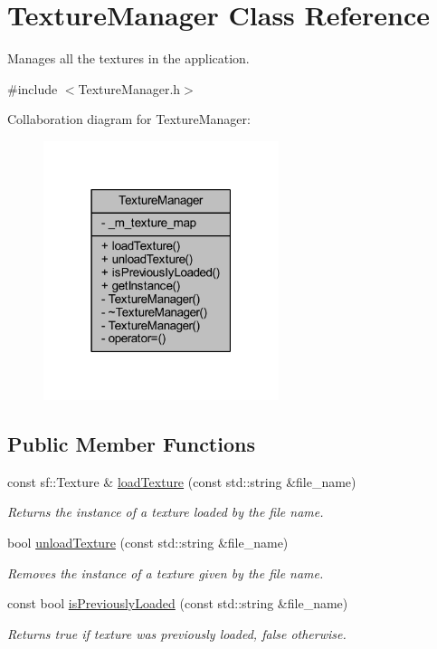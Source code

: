 \hypertarget{class_texture_manager}{\section{Texture\+Manager Class Reference}
\label{class_texture_manager}
}


Manages all the textures in the application.  




{\ttfamily \#include $<$Texture\+Manager.\+h$>$}



Collaboration diagram for Texture\+Manager\+:\nopagebreak
\begin{figure}[H]
\begin{center}
\leavevmode
\includegraphics[width=195pt]{class_texture_manager__coll__graph}
\end{center}
\end{figure}
\subsection*{Public Member Functions}
\begin{DoxyCompactItemize}
\item 
const sf\+::\+Texture \& \hyperlink{class_texture_manager_aa631660b783d448a29b1096c64fe65e4}{load\+Texture} (const std\+::string \&file\+\_\+name)
\begin{DoxyCompactList}\small\item\em Returns the instance of a texture loaded by the file name. \end{DoxyCompactList}\item 
bool \hyperlink{class_texture_manager_a8a77e473313f9c07df6b76eafa5b5bd2}{unload\+Texture} (const std\+::string \&file\+\_\+name)
\begin{DoxyCompactList}\small\item\em Removes the instance of a texture given by the file name. \end{DoxyCompactList}\item 
const bool \hyperlink{class_texture_manager_a8ec1c28bde7e07f64d3e155add36c0df}{is\+Previously\+Loaded} (const std\+::string \&file\+\_\+name)
\begin{DoxyCompactList}\small\item\em Returns true if texture was previously loaded, false otherwise. \end{DoxyCompactList}\end{DoxyCompactItemize}
